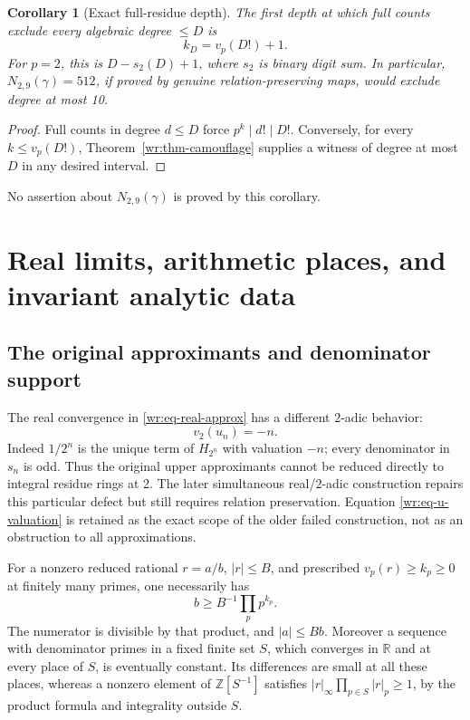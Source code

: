\documentclass[11pt,a4paper]{article}
\newcommand{\R}{\mathbb R}
\newcommand{\Z}{\mathbb Z}
\newtheorem{corollary}[theorem]{Corollary}
\theoremstyle{definition}
\theoremstyle{remark}
\numberwithin{equation}{section}
\begin{document}
\begin{corollary}[Exact full-residue depth]\label{wr:cor-depth}
The first depth at which full counts exclude every algebraic degree
\(\le D\) is
\[
 k_D=v_p(D!)+1.
\]
For \(p=2\), this is \(D-s_2(D)+1\), where \(s_2\) is binary digit
sum. In particular, \(N_{2,9}(\gamma)=512\), if proved by genuine
relation-preserving maps, would exclude degree at most 10.
\end{corollary}
\begin{proof}
Full counts in degree \(d\le D\) force \(p^k\mid d!\mid D!\).
Conversely, for every \(k\le v_p(D!)\),
Theorem~\ref{wr:thm-camouflage} supplies a witness of degree at most
\(D\) in any desired interval.
\end{proof}
No assertion about \(N_{2,9}(\gamma)\) is proved by this corollary.

\section{Real limits, arithmetic places, and invariant analytic data}
\label{wr:sec-invariants}

\subsection{The original approximants and denominator support}

The real convergence in \eqref{wr:eq-real-approx} has a different
\(2\)-adic behavior:
\begin{equation}\label{wr:eq-u-valuation}
 v_2(u_n)=-n.
\end{equation}
Indeed \(1/2^n\) is the unique term of \(H_{2^n}\) with valuation
\(-n\); every denominator in \(s_n\) is odd. Thus the original upper
approximants cannot be reduced directly to integral residue rings at
2. The later simultaneous real/\(2\)-adic construction repairs this
particular defect but still requires relation preservation. Equation
\eqref{wr:eq-u-valuation} is retained as the exact scope of the older
failed construction, not as an obstruction to all approximations.

For a nonzero reduced rational \(r=a/b\), \(|r|\le B\), and prescribed
\(v_p(r)\ge k_p\ge0\) at finitely many primes, one necessarily has
\begin{equation}\label{wr:eq-denominator-budget}
 b\ge B^{-1}\prod_p p^{k_p}.
\end{equation}
The numerator is divisible by that product, and \(|a|\le Bb\).
Moreover a sequence with denominator primes in a fixed finite set
\(S\), which converges in \(\R\) and at every place of \(S\), is
eventually constant. Its differences are small at all these places,
whereas a nonzero element of \(\Z[S^{-1}]\) satisfies
\(|r|_\infty\prod_{p\in S}|r|_p\ge1\), by the product formula and
integrality outside \(S\).
\end{document}
